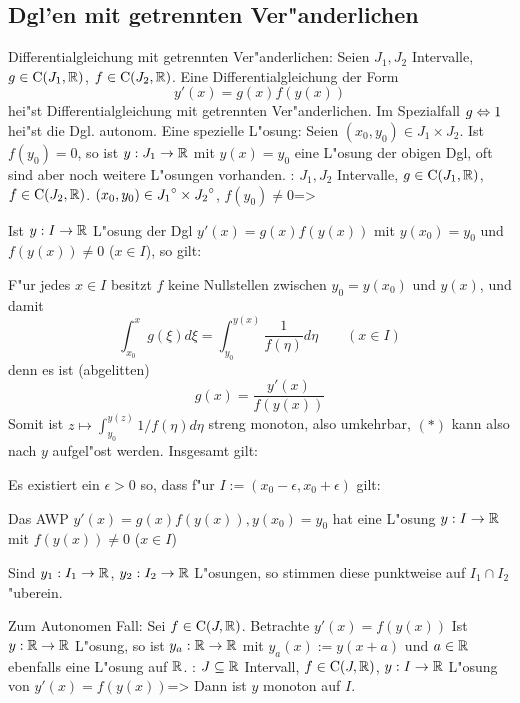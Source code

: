 \subsection{Dgl'en mit getrennten Ver"anderlichen}
 Differentialgleichung mit getrennten Ver"anderlichen:{
  Seien $J_1,J_2$ Intervalle, $g\in{\rm C}(J_1,\mathbb R)$, 
  $f\in{\rm C}(J_2,\mathbb R)$. Eine Differentialgleichung der Form
  \[y'(x)=g(x)f(y(x))
    \]
  hei"st Differentialgleichung mit getrennten Ver"anderlichen.
  Im Spezialfall $g\ident 1$ hei"st die Dgl. autonom.
  }
\remark Eine spezielle L"osung:{
  Seien $(x_0,y_0)\in J_1\times J_2$. Ist $f(y_0)=0$, so ist
  $y:J_1\to\mathbb R$ mit $y(x)=y_0$ eine L"osung der obigen Dgl, oft
  sind aber noch weitere L"osungen vorhanden.
  }
\theorem:
  $J_1,J_2$ Intervalle, $g\in{\rm C}(J_1,\mathbb R)$, 
  $f\in{\rm C}(J_2,\mathbb R)$. $(x_0,y_0)\in {J_1}^\circ\times{J_2}^\circ$,
  $f(y_0)\neq 0$=>{
  Ist $y:I\to\mathbb R$ L"osung der Dgl $y'(x)=g(x)f(y(x))$ mit 
  $y(x_0)=y_0$ und $f(y(x))\neq 0$ ($x\in I$), so gilt:
  
  F"ur jedes $x\in I$ besitzt $f$ keine Nullstellen zwischen 
  $y_0=y(x_0)$ und $y(x)$, und damit
  \[\int_{x_0}^x g(\xi)d\xi=\int_{y_0}^{y(x)} \frac 1 {f(\eta)} d\eta
    \qquad (x\in I)
    \]
  denn es ist (abgelitten)
  \begin{equation}
    g(x)=\frac{y'(x)}{f(y(x))}
    \tag{$*$}
    \end{equation}
  Somit ist $z\mapsto\int_{y_0}^{y(z)} 1/f(\eta) d\eta$ streng monoton, also
  umkehrbar, $(*)$ kann also nach $y$ aufgel"ost werden. Insgesamt gilt:
  
  Es existiert ein $\epsilon>0$ so, dass f"ur $I:=(x_0-\epsilon,x_0+\epsilon)$ 
  gilt:
  \begin{stmts}
    \item Das AWP $y'(x)=g(x)f(y(x)),y(x_0)=y_0$ hat eine L"osung
      $y:I\to\mathbb R$ mit $f(y(x))\neq 0$ ($x\in I$)
    \item Sind $y_1:I_1\to\mathbb R$, $y_2:I_2\to\mathbb R$ L"osungen, so stimmen diese
      punktweise auf $I_1\cap I_2$ "uberein.
    \end{stmts}
  }
\remark Zum Autonomen Fall:{
  Sei $f\in{\rm C}(J,\mathbb R)$. Betrachte $y'(x)=f(y(x))$ Ist $y:\mathbb R\to\mathbb R$
  L"osung, so ist $y_a:\mathbb R\to\mathbb R$ mit $y_a(x):=y(x+a)$ und $a\in\mathbb R$
  ebenfalls eine L"osung auf $\mathbb R$.
  }
\theorem:
  $J\subseteq\mathbb R$ Intervall, $f\in{\rm C}(J,\mathbb R)$, $y:I\to\mathbb R$
  L"osung von $y'(x)=f(y(x))$=>{
  Dann ist $y$ monoton auf $I$.
  }
